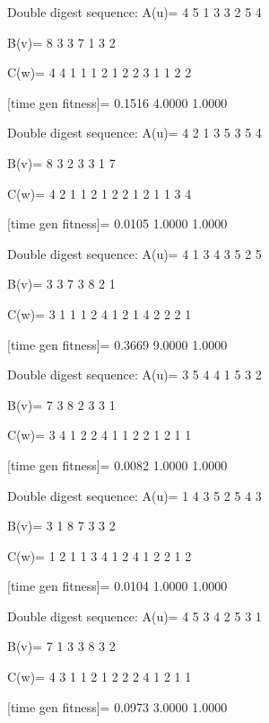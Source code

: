 Double digest sequence:
A(u)=
     4     5     1     3     3     2     5     4

B(v)=
     8     3     3     7     1     3     2

C(w)=
     4     4     1     1     1     2     1     2     2     3     1     1     2     2

[time gen fitness]=
    0.1516    4.0000    1.0000

Double digest sequence:
A(u)=
     4     2     1     3     5     3     5     4

B(v)=
     8     3     2     3     3     1     7

C(w)=
     4     2     1     1     2     1     2     2     1     2     1     1     3     4

[time gen fitness]=
    0.0105    1.0000    1.0000

Double digest sequence:
A(u)=
     4     1     3     4     3     5     2     5

B(v)=
     3     3     7     3     8     2     1

C(w)=
     3     1     1     1     2     4     1     2     1     4     2     2     2     1

[time gen fitness]=
    0.3669    9.0000    1.0000

Double digest sequence:
A(u)=
     3     5     4     4     1     5     3     2

B(v)=
     7     3     8     2     3     3     1

C(w)=
     3     4     1     2     2     4     1     1     2     2     1     2     1     1

[time gen fitness]=
    0.0082    1.0000    1.0000

Double digest sequence:
A(u)=
     1     4     3     5     2     5     4     3

B(v)=
     3     1     8     7     3     3     2

C(w)=
     1     2     1     1     3     4     1     2     4     1     2     2     1     2

[time gen fitness]=
    0.0104    1.0000    1.0000

Double digest sequence:
A(u)=
     4     5     3     4     2     5     3     1

B(v)=
     7     1     3     3     8     3     2

C(w)=
     4     3     1     1     2     1     2     2     2     4     1     2     1     1

[time gen fitness]=
    0.0973    3.0000    1.0000


